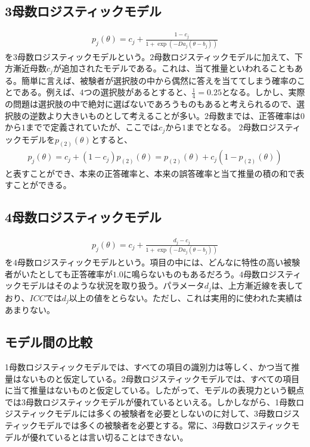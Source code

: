 \documentclass[12pt]{jarticle}
\begin{document}
\subsection{3母数ロジスティックモデル}
\begin{eqnarray}
  \label{04}
  \displaystyle p_j(\theta) = c_j + \frac{1-c_j}{1+\exp(-Da_j(\theta - b_j))}
\end{eqnarray}
を$3$母数ロジスティックモデルという。$2$母数ロジスティックモデルに加えて、下方漸近母数$c_j$が追加されたモデルである。これは、当て推量といわれることもある。簡単に言えば、被験者が選択肢の中から偶然に答えを当ててしまう確率のことである。例えば、$4$つの選択肢があるとすると、$\displaystyle \frac{1}{4}=0.25$となる。しかし、実際の問題は選択肢の中で絶対に選ばないであろうものもあると考えられるので、選択肢の逆数より大きいものとして考えることが多い。$2$母数までは、正答確率は$0$から$1$までで定義されていたが、ここでは$c_j$から$1$までとなる。
$2$母数ロジスティックモデルを$p_{(2)}(\theta)$とすると、
\begin{eqnarray}
  \displaystyle p_{j}(\theta) = c_j + (1-c_j)p_{(2)}(\theta)= p_{(2)}(\theta) + c_j(1-p_{(2)}(\theta))
\end{eqnarray}
と表すことができ、本来の正答確率と、本来の誤答確率と当て推量の積の和で表すことができる。
\subsection{4母数ロジスティックモデル}
\begin{eqnarray}
  \label{05}
  \displaystyle p_j(\theta) = c_j + \frac{d_j-c_j}{1+\exp(-Da_j(\theta - b_j))}
\end{eqnarray}
を$4$母数ロジスティックモデルという。項目の中には、どんなに特性の高い被験者がいたとしても正答確率が$1.0$に鳴らないものもあるだろう。$4$母数ロジスティックモデルはそのような状況を取り扱う。パラメータ$d_j$は、上方漸近線を表しており、$ICC$では$d_j$以上の値をとらない。ただし、これは実用的に使われた実績はあまりない。
\subsection{モデル間の比較}
1母数ロジスティックモデルでは、すべての項目の識別力は等しく、かつ当て推量はないものと仮定している。2母数ロジスティックモデルでは、すべての項目に当て推量はないものと仮定している。したがって、モデルの表現力という観点では3母数ロジスティックモデルが優れているといえる。しかしながら、1母数ロジスティックモデルには多くの被験者を必要としないのに対して、3母数ロジスティックモデルでは多くの被験者を必要とする。常に、3母数ロジスティックモデルが優れているとは言い切ることはできない。
\end{document}
